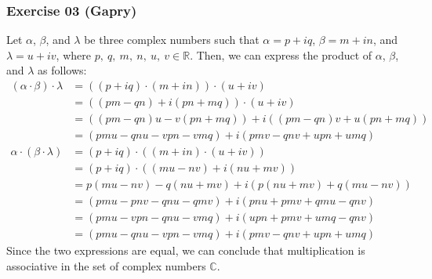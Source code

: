 \subsubsection*{Exercise 03 (Gapry)}

\begin{flushleft}
Let $\alpha$, $\beta$, and $\lambda$ be three complex numbers such that $\alpha = p + iq$, $\beta  = m + in$, and $\lambda = u + iv$, where $p,\ q,\ m,\ n,\ u,\ v \in \mathbb{R}$. Then, we can express the product of $\alpha$, $\beta$, and $\lambda$ as follows:
\begin{align*}
(\alpha \cdot \beta) \cdot \lambda &= ((p + iq) \cdot (m + in)) \cdot (u + iv)               \\
                                   &= ((pm - qn) + i(pn + mq)) \cdot (u + iv)                \\
                                   &= ((pm - qn)u - v(pn + mq)) + i((pm - qn)v + u(pn + mq)) \\
                                   &= (pmu - qnu - vpn - vmq) + i(pmv - qnv + upn + umq)     \\
\alpha \cdot (\beta \cdot \lambda) &= (p + iq) \cdot ((m + in) \cdot (u + iv))               \\
                                   &= (p + iq) \cdot ((mu - nv) + i(nu + mv))                \\
                                   &= p(mu - nv) - q(nu + mv) + i(p(nu + mv) + q(mu - nv))   \\
                                   &= (pmu - pnv - qnu - qmv) + i(pnu + pmv + qmu - qnv)     \\
                                   &= (pmu - vpn - qnu - vmq) + i(upn + pmv + umq - qnv)     \\
                                   &= (pmu - qnu - vpn - vmq) + i(pmv - qnv + upn + umq)     
\end{align*}
Since the two expressions are equal, we can conclude that multiplication is associative in the set of complex numbers $\mathbb{C}$.
\end{flushleft}

